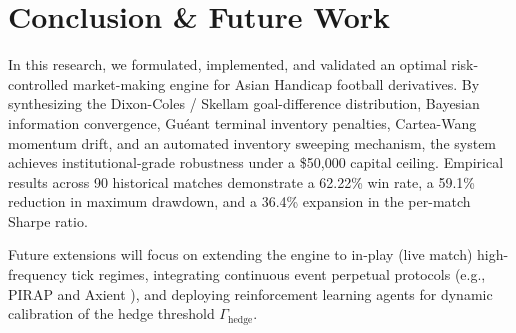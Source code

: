 \documentclass[10pt,twocolumn]{article}
\begin{document}
\FloatBarrier

\section{Conclusion \& Future Work}
\label{sec:conclusion}

In this research, we formulated, implemented, and validated an optimal risk-controlled market-making engine for Asian Handicap football derivatives. By synthesizing the Dixon-Coles / Skellam goal-difference distribution, Bayesian information convergence, Guéant terminal inventory penalties, Cartea-Wang momentum drift, and an automated inventory sweeping mechanism, the system achieves institutional-grade robustness under a \$50,000 capital ceiling. Empirical results across 90 historical matches demonstrate a 62.22\% win rate, a 59.1\% reduction in maximum drawdown, and a 36.4\% expansion in the per-match Sharpe ratio.

Future extensions will focus on extending the engine to in-play (live match) high-frequency tick regimes, integrating continuous event perpetual protocols (e.g., PIRAP \cite{8} and Axient \cite{9}), and deploying reinforcement learning agents for dynamic calibration of the hedge threshold $\Gamma_{\text{hedge}}$.
\end{document}
